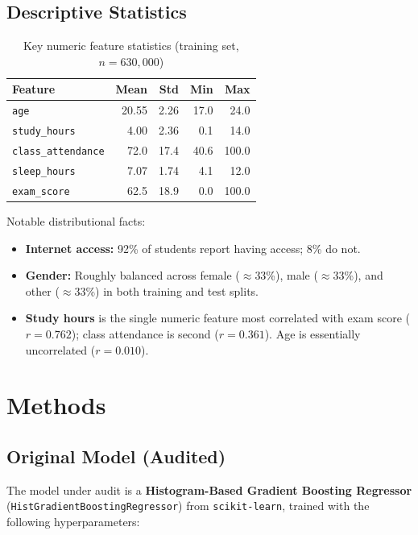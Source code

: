 \documentclass[12pt, letterpaper]{article}
\begin{document}
\subsection{Descriptive Statistics}

\begin{table}[H]
\centering
\caption{Key numeric feature statistics (training set, $n = 630{,}000$)}
\begin{tabular}{@{}lrrrr@{}}
\toprule
\textbf{Feature} & \textbf{Mean} & \textbf{Std} & \textbf{Min} & \textbf{Max} \\
\midrule
\texttt{age}               & 20.55 & 2.26 & 17.0 & 24.0 \\
\texttt{study\_hours}      &  4.00 & 2.36 &  0.1 & 14.0 \\
\texttt{class\_attendance} & 72.0  & 17.4 & 40.6 & 100.0 \\
\texttt{sleep\_hours}      &  7.07 & 1.74 &  4.1 & 12.0 \\
\texttt{exam\_score}       & 62.5  & 18.9 &  0.0 & 100.0 \\
\bottomrule
\end{tabular}
\end{table}

Notable distributional facts:
\begin{itemize}[noitemsep]
    \item \textbf{Internet access:} 92\% of students report having access; 8\% do not.
    \item \textbf{Gender:} Roughly balanced across female ($\approx$33\%), male ($\approx$33\%), and other ($\approx$33\%) in both training and test splits.
    \item \textbf{Study hours} is the single numeric feature most correlated with exam score ($r = 0.762$); class attendance is second ($r = 0.361$). Age is essentially uncorrelated ($r = 0.010$).
\end{itemize}

\section{Methods}

\subsection{Original Model (Audited)}

The model under audit is a \textbf{Histogram-Based Gradient Boosting Regressor}
(\texttt{HistGradientBoostingRegressor}) from \texttt{scikit-learn}, trained
with the following hyperparameters:
\end{document}
